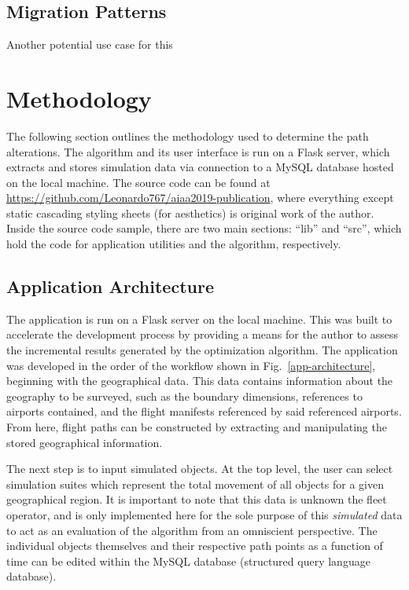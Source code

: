 \documentclass[conf]{new-aiaa}
\begin{document}
\subsection{Migration Patterns}

Another potential use case for this 




\section{Methodology}

The following section outlines the methodology used to determine the path alterations. The algorithm and its user interface is run on a Flask server, which extracts and stores simulation data via connection to a MySQL database hosted on the local machine. The source code can be found at \url{https://github.com/Leonardo767/aiaa2019-publication}, where everything except static cascading styling sheets (for aesthetics) is original work of the author. Inside the source code sample, there are two main sections: ``lib'' and ``src'', which hold the code for application utilities and the algorithm, respectively.

\subsection{Application Architecture}
The application is run on a Flask server on the local machine. This was built to accelerate the development process by providing a means for the author to assess the incremental results generated by the optimization algorithm. The application was developed in the order of the workflow shown in Fig.~\ref{app-architecture}, beginning with the geographical data. This data contains information about the geography to be surveyed, such as the boundary dimensions, references to airports contained, and the  flight manifests referenced by said referenced airports. From here, flight paths can be constructed by extracting and manipulating the stored geographical information.

The next step is to input simulated objects. At the top level, the user can select simulation suites which represent the total movement of all objects for a given geographical region. It is important to note that this data is unknown the fleet operator, and is only implemented here for the sole purpose of this \emph{simulated} data to act as an evaluation of the algorithm from an omniscient perspective. The individual objects themselves and their respective path points as a function of time can be edited within the MySQL database (structured query language database).
\end{document}
